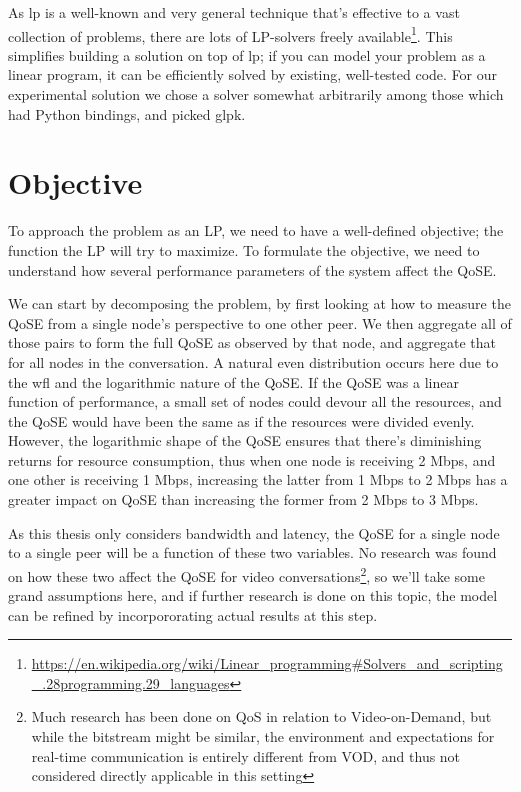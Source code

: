 As \gls{lp} is a well-known and very general technique that's effective to a vast collection of problems, there are lots of LP-solvers freely available\footnote{\url{https://en.wikipedia.org/wiki/Linear_programming\#Solvers_and_scripting_.28programming.29_languages}}. This simplifies building a solution on top of \gls{lp}; if you can model your problem as a linear program, it can be efficiently solved by existing, well-tested code. For our experimental solution we chose a solver somewhat arbitrarily among those which had Python bindings, and picked \gls{glpk}.


\section{Objective}

To approach the problem as an LP, we need to have a well-defined objective; the function the LP will try to maximize. To formulate the objective, we need to understand how several performance parameters of the system affect the QoSE.

We can start by decomposing the problem, by first looking at how to measure the QoSE from a single node's perspective to one other peer. We then aggregate all of those pairs to form the full QoSE as observed by that node, and aggregate that for all nodes in the conversation. A natural even distribution occurs here due to the \gls{wfl} and the logarithmic nature of the QoSE. If the QoSE was a linear function of performance, a small set of nodes could devour all the resources, and the QoSE would have been the same as if the resources were divided evenly. However, the logarithmic shape of the QoSE ensures that there's diminishing returns for resource consumption, thus when one node is receiving 2 Mbps, and one other is receiving 1 Mbps, increasing the latter from 1 Mbps to 2 Mbps has a greater impact on QoSE than increasing the former from 2 Mbps to 3 Mbps.

As this thesis only considers bandwidth and latency, the QoSE for a single node to a single peer will be a function of these two variables. No research was found on how these two affect the QoSE for video conversations\footnote{Much research has been done on QoS in relation to Video-on-Demand, but while the bitstream might be similar, the environment and expectations for real-time communication is entirely different from VOD, and thus not considered directly applicable in this setting}, so we'll take some grand assumptions here, and if further research is done on this topic, the model can be refined by incorpororating actual results at this step.

